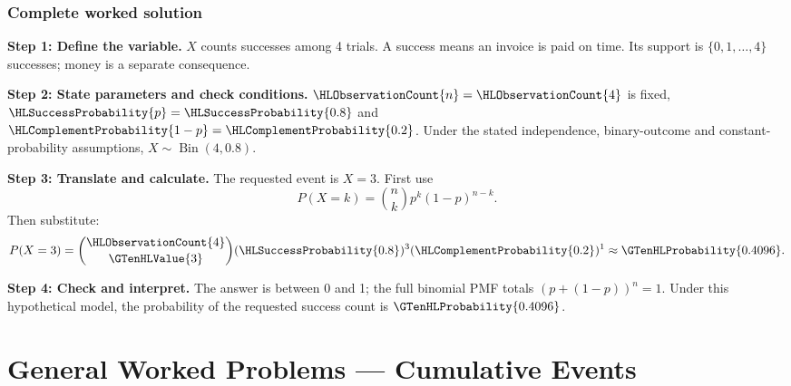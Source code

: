 
\subsubsection*{Complete worked solution}\label{sol:invoices}
\par\noindent\begin{minipage}{\linewidth}
\textbf{Step 1: Define the variable.} $X$ counts successes among 4 trials. A success means an invoice is paid on time. Its support is $\{0,1,\ldots,4\}$ successes; money is a separate consequence.
\end{minipage}\par\medskip
\par\noindent\begin{minipage}{\linewidth}
\textbf{Step 2: State parameters and check conditions.} $\HLObservationCount{n}=\HLObservationCount{4}$ is fixed, $\HLSuccessProbability{p}=\HLSuccessProbability{0.8}$ and $\HLComplementProbability{1-p}=\HLComplementProbability{0.2}$. Under the stated independence, binary-outcome and constant-probability assumptions, $X\sim\operatorname{Bin}(4,0.8)$.
\end{minipage}\par\medskip
\par\noindent\begin{minipage}{\linewidth}
\textbf{Step 3: Translate and calculate.} The requested event is $ X=3$. First use
\[P(X=k)=\binom nk p^k(1-p)^{n-k}.\]
Then substitute:
\[P(X=3)=\binom{\HLObservationCount{4}}{\GTenHLValue{3}}(\HLSuccessProbability{0.8})^{3}(\HLComplementProbability{0.2})^{1}\approx \GTenHLProbability{0.4096}.\]
\end{minipage}\par\medskip
\par\noindent\begin{minipage}{\linewidth}
\textbf{Step 4: Check and interpret.} The answer is between 0 and 1; the full binomial PMF totals $(p+(1-p))^n=1$. Under this hypothetical model, the probability of the requested success count is $\GTenHLProbability{0.4096}$.
\end{minipage}\par\medskip

\clearpage
\section{General Worked Problems --- Cumulative Events}\label{sec:t2-c4-intermediate}

